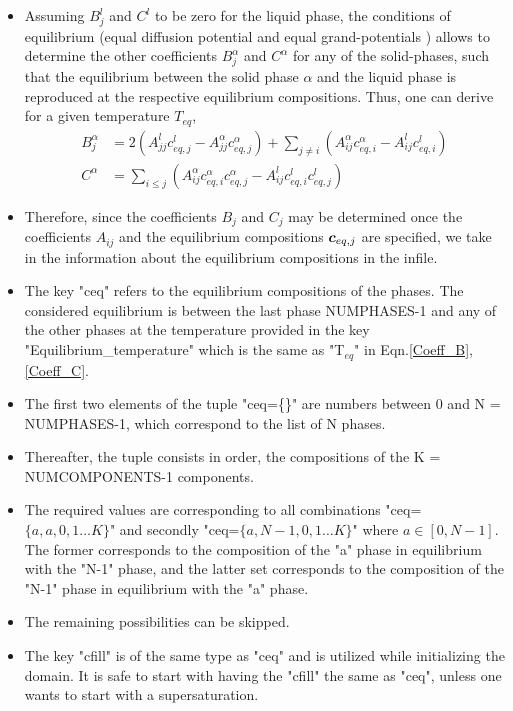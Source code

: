 \documentclass[a4paper,10pt]{article}
\newcommand{\vc}{\mbox{\boldmath{$c$}}}
\begin{document}
\begin{itemize}
\item Assuming $B_j^{l}$ and $C^{l}$ to be zero for
the liquid phase, the conditions of equilibrium (equal diffusion potential and equal grand-potentials
) allows to determine the other coefficients $B_j^{\alpha}$ and $C^{\alpha}$ for
any of the solid-phases, such that the equilibrium between the solid phase $\alpha$
and the liquid phase is reproduced at the respective equilibrium compositions. 
Thus, one can derive for a given temperature $T_{eq}$,
\begin{align}
 B_{j}^{\alpha} &= 2(A_{jj}^{l}c_{eq,j}^{l} - A_{jj}^{\alpha}c_{eq,j}^{\alpha}) 
 + \sum_{j\neq i}\left(A_{ij}^{\alpha} c_{eq,i}^{\alpha} - A_{ij}^{l} c_{eq,i}^{l}\right)
 \label{Coeff_B}\\
 C^{\alpha}    &= \sum_{i\leq j }\left(A_{ij}^{\alpha} c_{eq,i}^{\alpha}c_{eq,j}^{\alpha} - 
 A_{ij}^{l} c_{eq,i}^{l}c_{eq,j}^{l}\right)
 \label{Coeff_C}
\end{align}

\item Therefore, since the coefficients $B_j$ and $C_j$ may be determined once the coefficients 
$A_{ij}$ and the equilibrium compositions $\vc_{eq,j}$ are specified, we take in the information about 
the equilibrium compositions in the infile. 

\item The key "ceq" refers to the equilibrium compositions of the phases. The considered equilibrium is between the last phase 
NUMPHASES-1 and any of the other phases at the temperature provided in the key "Equilibrium\_temperature" which is the same as "T$_{eq}$" 
in Eqn.\ref{Coeff_B},\ref{Coeff_C}.
\item The first two elements of the tuple "ceq=\{\}" are numbers between 0 and N = NUMPHASES-1, which correspond 
to the list of N phases.
\item Thereafter, the tuple consists in order, the compositions of the K = NUMCOMPONENTS-1 components.
\item The required values are corresponding to all combinations "ceq=$\{a, a, 0, 1\ldots K\}$"
and secondly "ceq=$\{a, N-1, 0, 1\ldots K\}$" where $a\in \left[0,N-1\right]$. The former corresponds
to the composition of the "a" phase in equilibrium with the "N-1" phase, and the latter set 
corresponds to the composition of the "N-1" phase in equilibrium with the "a" phase.
\item The remaining possibilities can be skipped.
\item The key "cfill" is of the same type as "ceq" and is utilized while initializing the domain. It is safe to 
start with having the "cfill" the same as "ceq", unless one wants to start with a supersaturation.


\end{itemize}
\end{document}
